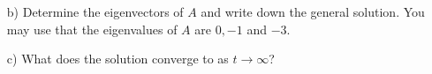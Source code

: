 \documentclass[12pt]{exam}
\begin{document}
\begin{questions}
\begin{enumerate}
                \item[b)] Determine the eigenvectors of $A$ and write down the general solution. You may use that the eigenvalues of $A$ are $0, -1$ and $-3$. 
                \vspace{10cm} 
                \item[c)] What does the solution converge to as $t \to \infty$? 
        \end{enumerate}
        
    \newpage \InitialsRight
    \Scratch 
        
        
        
        
    
\end{questions}
    


\end{document}
